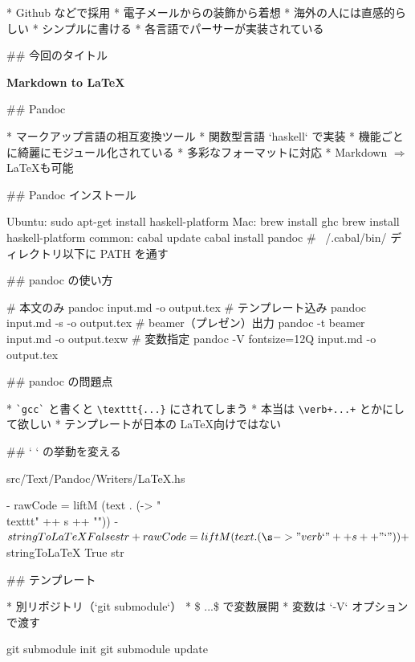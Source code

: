 * Github などで採用
* 電子メールからの装飾から着想
    * 海外の人には直感的らしい
* シンプルに書ける
* 各言語でパーサーが実装されている

## 今回のタイトル

\vspace{-25pt}
\begin{center}
 \Huge\bfseries
 Markdown to \LaTeX
\end{center}

## Pandoc

* マークアップ言語の相互変換ツール
* 関数型言語 `haskell` で実装
* 機能ごとに綺麗にモジュール化されている
* 多彩なフォーマットに対応
* Markdown $\Rightarrow$ \LaTeX も可能

## Pandoc インストール

\small

    Ubuntu:
      sudo apt-get install haskell-platform
    Mac:
      brew install ghc
      brew install haskell-platform
    common:
      cabal update
      cabal install pandoc
    # ~/.cabal/bin/ ディレクトリ以下に PATH を通す


## pandoc の使い方

\small

    # 本文のみ
    pandoc input.md -o output.tex
    # テンプレート込み
    pandoc input.md -s -o output.tex
    # beamer（プレゼン）出力
    pandoc -t beamer input.md -o output.texw
    # 変数指定
    pandoc -V fontsize=12Q input.md -o output.tex

## pandoc の問題点

* \verb/`gcc`/ と書くと \verb/\texttt{...}/ にされてしまう
* 本当は \verb/\verb+...+/ とかにして欲しい
* テンプレートが日本の \LaTeX 向けではない

## ` ` の挙動を変える

\small

    src/Text/Pandoc/Writers/LaTeX.hs

\footnotesize

    - rawCode = liftM (text . (\s -> "\\texttt{" ++ s ++ "}"))
    -                  $ stringToLaTeX False str
    + rawCode = liftM (text . (\s -> "\\verb`" ++ s ++ "`"))
    +                  $ stringToLaTeX True str


## テンプレート

* 別リポジトリ（`git submodule`）
* \$ ...\$ で変数展開
    * 変数は `-V` オプションで渡す

\small

    git submodule init
    git submodule update

